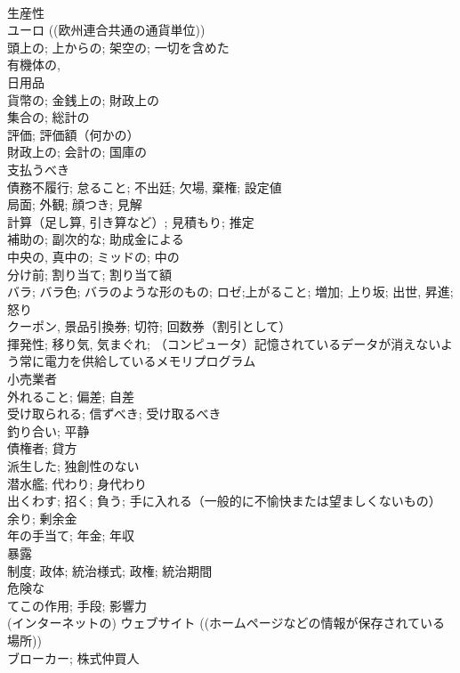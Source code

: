 \documentclass[8pt]{extreport}
\begin{document}
\begin{CJK}{UTF8}{min}
\\	生産性	
\\	ユーロ ((欧州連合共通の通貨単位))	
\\	頭上の; 上からの; 架空の; 一切を含めた	
\\	有機体の,
\\	日用品	
\\	貨幣の; 金銭上の; 財政上の	
\\	集合の; 総計の	
\\	評価; 評価額（何かの）	
\\	財政上の; 会計の; 国庫の	
\\	支払うべき	
\\	債務不履行; 怠ること; 不出廷; 欠場, 棄権; 設定値	
\\	局面; 外観; 顔つき; 見解	
\\	計算（足し算, 引き算など）; 見積もり; 推定	
\\	補助の; 副次的な; 助成金による	
\\	中央の, 真中の; ミッドの; 中の	
\\	分け前; 割り当て; 割り当て額	
\\	バラ; バラ色; バラのような形のもの; ロゼ;上がること; 増加; 上り坂; 出世, 昇進; 怒り	
\\	クーポン, 景品引換券; 切符; 回数券（割引として）	
\\	揮発性; 移り気, 気まぐれ; （コンピュータ）記憶されているデータが消えないよう常に電力を供給しているメモリプログラム	
\\	小売業者	
\\	外れること; 偏差; 自差	
\\	受け取られる; 信ずべき; 受け取るべき	
\\	釣り合い; 平静	
\\	債権者; 貸方	
\\	派生した; 独創性のない	
\\	潜水艦; 代わり; 身代わり	
\\	出くわす; 招く; 負う; 手に入れる（一般的に不愉快または望ましくないもの）	
\\	余り; 剰余金	
\\	年の手当て; 年金; 年収	
\\	暴露	
\\	制度; 政体; 統治様式; 政権; 統治期間	
\\	危険な	
\\	てこの作用; 手段; 影響力	
\\	(インターネットの) ウェブサイト ((ホームページなどの情報が保存されている場所))	
\\	ブローカー; 株式仲買人	

\end{CJK}
\end{document}
